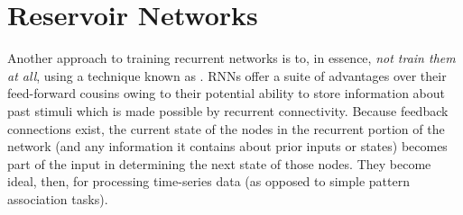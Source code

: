 \chapter{Reservoir Networks}\label{ch_reservoir}





Another approach to training recurrent networks is to, in essence, \emph{not train them at all}, using a technique known as . RNNs offer a suite of advantages over their feed-forward cousins owing to their potential ability to store information about past stimuli which is made possible by recurrent connectivity. Because feedback connections exist, the current state of the nodes in the recurrent portion of the network (and any information it contains about prior inputs or states) becomes part of the input in determining the next state of those nodes. They become ideal, then, for processing time-series data (as opposed to simple pattern association tasks). 

